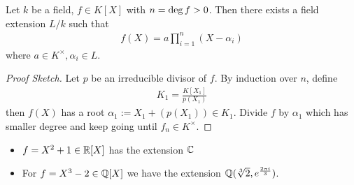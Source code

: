 \begin{thm}[Kronecker]
  Let $k$ be a field, $f \in K[X]$ with $n = \operatorname{deg} f > 0$. 
  Then there exists a field extension $L/k$ such that
  \begin{align*}
    f(X) = a \prod_{i=1}^{n}(X - \alpha_i)
  \end{align*}
  where $a \in K^{\times}, \alpha_i \in L$.
\end{thm}
\begin{proof}[Proof Sketch]
  Let $p$ be an irreducible divisor of $f$.
  By induction over $n$, define
  \begin{align*}
    K_1 = \frac{K[X_1]}{p(X_1)}
  \end{align*}
  then $f(X)$ has a root $\alpha_1 := X_1 + (p(X_1)) \in K_1$.
  Divide $f$ by $\alpha_1$ which has smaller degree and keep going until $f_n \in K^{\times}$.
\end{proof}


\begin{itemize}
  \item $f = X^{2} + 1 \in \mathbb{R}[X]$ has the extension  $\mathbb{C}$
  \item For $f = X^{3} - 2 \in \mathbb{Q}[X]$ we have the extension $\mathbb{Q}(\sqrt[3]{2},e^{\frac{2 \pi i }{3}})$.
\end{itemize}


